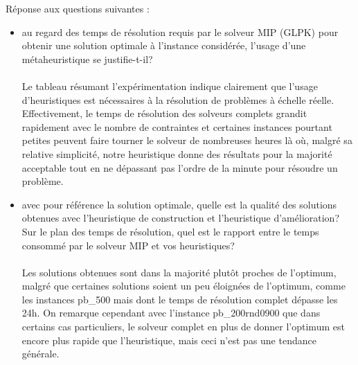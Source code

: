 \documentclass[ a4paper,10pt]{article}
\begin{document}
%
%


\vspace{5mm}
\noindent
{}
\vspace{2mm}

\noindent
Réponse aux questions suivantes :

\begin{itemize}
\item au regard des temps de résolution requis par le solveur MIP (GLPK) pour obtenir une solution optimale à l'instance considérée, l'usage d'une métaheuristique se justifie-t-il?
\\ \\
Le tableau résumant l'expérimentation indique clairement que l'usage d'heuristiques est nécessaires à la résolution de problèmes à échelle réelle. Effectivement, le temps de résolution des solveurs complets grandit rapidement avec le nombre de contraintes et certaines instances pourtant petites peuvent faire tourner le solveur de nombreuses heures là où, malgré sa relative simplicité, notre heuristique donne des résultats pour la majorité acceptable tout en ne dépassant pas l'ordre de la minute pour résoudre un problème.\\

\item avec pour référence la solution optimale, quelle est la qualité des solutions obtenues avec l'heuristique de construction et l'heuristique d'amélioration? \\
Sur le plan des temps de résolution, quel est le rapport  entre le temps consommé par le solveur MIP et vos heuristiques? \\ \\

Les solutions obtenues sont dans la majorité plutôt proches de l'optimum, malgré que certaines solutions soient un peu éloignées de l'optimum, comme les instances pb\_500 mais dont le temps de résolution complet dépasse les 24h. On remarque cependant avec l'instance pb\_200rnd0900 que dans certains cas particuliers, le solveur complet en plus de donner l'optimum est encore plus rapide que l'heuristique, mais ceci n'est pas une tendance générale. \\


\end{itemize}
\end{document}
